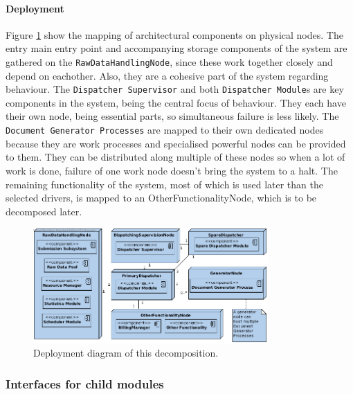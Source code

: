 \documentclass[a4paper,10pt]{article}
\begin{document}
\paragraph{Deployment}
Figure \ref{fig:it1-depl_main} show the mapping of architectural components on physical nodes.
The entry main entry point and accompanying storage components of the system are gathered on the \texttt{RawDataHandlingNode}, since these work together closely and depend on eachother. Also, they are a cohesive part of the system regarding behaviour. The \texttt{Dispatcher Supervisor} and both \texttt{Dispatcher Module}s are key components in the system, being the central focus of behaviour. They each have their own node, being essential parts, so simultaneous failure is less likely. The \texttt{Document Generator Processes} are mapped to their own dedicated nodes because they are work processes and specialised powerful nodes can be provided to them. They can be distributed along multiple of these nodes so when a lot of work is done, failure of one work node doesn't bring the system to a halt. The remaining functionality of the system, most of which is used later than the selected drivers, is mapped to an OtherFunctionalityNode, which is to be decomposed later.

\begin{figure}[!htp]
    \centering
    \includegraphics[width=0.8\textwidth]{depl_diag_1.png}
    \caption{Deployment diagram of this decomposition.}\label{fig:it1-depl_main}
\end{figure}

\subsubsection{Interfaces for child modules}
\end{document}
